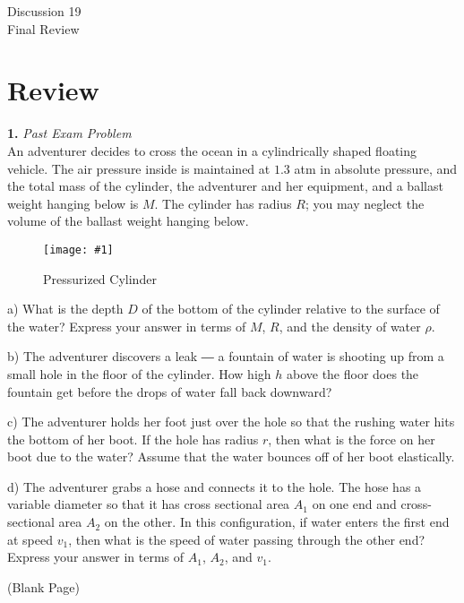 \documentclass[11pt]{article}
\newcommand{\fig}[4]{
    \begin{figure}[H]
        \centering
        \texttt{[image: \#1]}
        \caption{#2}
        \label{exp4fit}
    \end{figure}
}
\theoremstyle{gangnamstyle}{\newtheorem{definition}{Definition}[]}
\theoremstyle{gangnamstyle}{\newtheorem{example}{Example}[]}
\theoremstyle{gangnamstyle}{\newtheorem{problem}{Problem}[]}
\begin{document}
\normalfont
\pagestyle{pages}


\begin{center}
\vspace{3in}
{\Large Discussion 19 } \\ [0.05in]
Final Review \\ [-0.5in]
\end{center}

\section{Review}

\textbf{1.} \textit{Past Exam Problem} \\
An adventurer decides to cross the ocean in a cylindrically shaped floating vehicle. The air pressure inside is maintained at $1.3$ atm in absolute pressure, and the total mass of the cylinder, the adventurer and her equipment, and a ballast weight hanging below is $M$. The cylinder has radius $R$; you may neglect the volume of the ballast weight hanging below. 
\fig{figs/0806/1.png}{Pressurized Cylinder}{0.6}{0}

a) What is the depth $D$ of the bottom of the cylinder relative to the surface of the water? Express your answer in terms of $M$, $R$, and the density of water $\rho$.

b) The adventurer discovers a leak ― a fountain of water is shooting up from a small hole in the floor of the cylinder. How high $h$ above the floor does the fountain get before the drops of water fall back downward?

c) The adventurer holds her foot just over the hole so that the rushing water hits the bottom of her boot. If the hole has radius $r$, then what is the force on her boot due to the water? Assume that the water bounces off of her boot elastically.

d) The adventurer grabs a hose and connects it to the hole. The hose has a variable diameter so that it has cross sectional area $A_1$ on one end and cross-sectional area $A_2$ on the other. In this configuration, if water enters the first end at speed $v_1$, then what is the speed of water passing through the other end? Express your answer in terms of $A_1$, $A_2$, and $v_1$.

\pagebreak

\begin{center}
(Blank Page)
\end{center}
\end{document}
